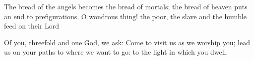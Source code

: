 \begin{otherlanguage}{english}The bread of the angels
becomes the bread of mortals;
the bread of heaven
puts an end to prefigurations.
O wondrous thing!
the poor, the slave and the humble
feed on their Lord

Of you, threefold and
one God, we ask:
Come to visit us
as we worship you;
lead us on your paths
to where we want to go:
to the light in which you dwell.\end{otherlanguage}